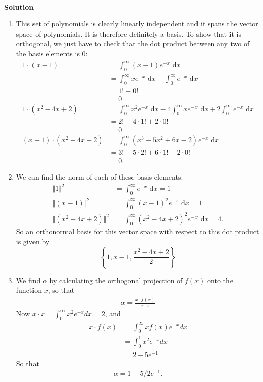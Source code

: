 \documentclass[11pt]{article}
\newcommand{\diff}{\,\mathrm{d}}
\begin{document}
\

\noindent \textbf{Solution}\\
\begin{enumerate}
\item This set of polynomials is clearly linearly independent and it spans the vector space of polynomials. It is therefore definitely a basis. To show that it is orthogonal, we just have to check that the dot product between any two of the basis elements is 0:
\begin{align*}
1\cdot (x-1) 	&=  \int_0^{\infty} (x-1) e^{-x} \, \diff x\\
			&=  \int_0^{\infty} x e^{-x} \, \diff x -  \int_0^{\infty}e^{-x} \, \diff x\\
			&= 1! - 0! \\
			&= 0\\
1\cdot (x^2-4x+2) 	&=  \int_0^{\infty} x^2 e^{-x} \, \diff x	- 4\int_0^{\infty}x e^{-x} \, \diff x	+ 2 \int_0^{\infty}e^{-x} \, \diff x\\
				&= 2! - 4\cdot 1! + 2\cdot 0! \\
				&= 0\\
(x-1) \cdot (x^2-4x+2) 	&= \int_0^{\infty} (x^3 -5x^2 + 6 x -2)  e^{-x} \, \diff x \\
					&= 3! - 5\cdot 2! + 6\cdot 1! -2\cdot 0!\\
					&= 0.			
\end{align*}
\item We can find the norm of each of these basis elements:
\begin{align*}
\Vert 1 \Vert^2 		&=  \int_0^{\infty} e^{-x} \, \diff x = 1 \\
\Vert (x-1) \Vert^2 	&=  \int_0^{\infty} (x-1)^2 e^{-x} \, \diff x = 1 \\
\Vert (x^2 - 4x + 2 )\Vert ^2 &= \int_0^{\infty} (x^2-4x+2)^2 e^{-x} \, \diff x = 4.
\end{align*}
So an orthonormal basis for this vector space with respect to this dot product is given by 
$$\left\{1, x-1,\frac{x^2-4x+2}{2} \right\}$$
\item We find $\alpha$ by calculating the orthogonal projection of $f(x)$ onto the function $x$, so that 
\begin{align}
\alpha = \frac{x\cdot f(x)}{x\cdot x}
\end{align}
Now $x\cdot x = \int_0^{\infty} x^2 e^{-x} dx = 2$, and 
\begin{align}
x\cdot f(x) &= \int_0^{\infty} xf(x) e^{-x} dx  \\
&= \int_0^1 x^2 e^{-x} dx\\
&= 2 - 5e^{-1}
\end{align}
So that 
\begin{align}
\alpha = 1 - 5/2e^{-1}.
\end{align}
\end{enumerate}

\
\end{document}
